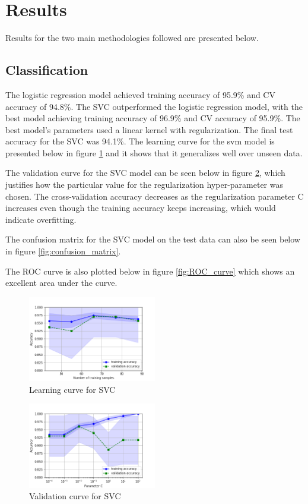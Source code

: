 \documentclass[acmtog]{acmart}
\begin{document}
\section{Results}

Results for the two main methodologies followed are presented below.

\subsection{Classification}
The logistic regression model achieved training accuracy of 95.9\% and CV accuracy of 94.8\%. The SVC outperformed the logistic regression model, with the best model achieving training accuracy of 96.9\% and CV accuracy of 95.9\%. The best model's parameters used a linear kernel with regularization. The final test accuracy for the SVC was 94.1\%.
The learning curve for the svm model is presented below in figure \ref{fig:learning_curve} and it shows that it generalizes well over unseen data.
\newline

The validation curve for the SVC model can be seen below in figure \ref{fig:validation_curve}, which justifies how the particular value for the regularization hyper-parameter was chosen. The cross-validation accuracy decreases as the regularization parameter C increases even though the training accuracy keeps increasing, which would indicate overfitting.

The confusion matrix for the SVC model on the test data can also be seen below in figure \ref{fig:confusion_matrix}.

The ROC curve is also plotted below in figure \ref{fig:ROC_curve} which shows an excellent area under the curve.

\begin{figure}[h]
  \includegraphics[width=0.5\textwidth]{learning_curve}
  \caption{Learning curve for SVC}
  \label{fig:learning_curve}
\end{figure}

\begin{figure}[h]
  \includegraphics[width=0.5\textwidth]{validation_curve}
  \caption{Validation curve for SVC}
  \label{fig:validation_curve}
\end{figure}
\end{document}

